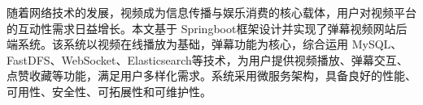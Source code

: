 
{}

\begin{abstractcn}
    随着网络技术的发展，视频成为信息传播与娱乐消费的核心载体，用户对视频平台的互动性需求日益增长。本文基于 Springboot框架设计并实现了弹幕视频网站后端系统。该系统以视频在线播放为基础，弹幕功能为核心，综合运用 MySQL、FastDFS、WebSocket、Elasticsearch等技术，为用户提供视频播放、弹幕交互、点赞收藏等功能，满足用户多样化需求。系统采用微服务架构，具备良好的性能、可用性、安全性、可拓展性和可维护性。
\end{abstractcn}